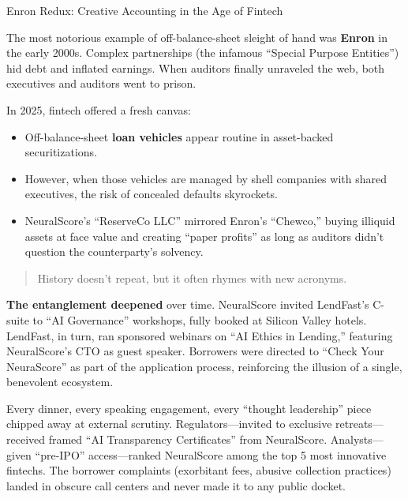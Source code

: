 \begin{HistoricalSidebar}{Enron Redux: Creative Accounting in the Age of Fintech}

The most notorious example of off-balance-sheet sleight of hand was \textbf{Enron} in the early 2000s. Complex partnerships (the infamous “Special Purpose Entities”) hid debt and inflated earnings. When auditors finally unraveled the web, both executives and auditors went to prison.

\medskip

In 2025, fintech offered a fresh canvas:
\begin{itemize}
  \item  Off-balance-sheet \textbf{loan vehicles} appear routine in asset-backed securitizations.
  \item  However, when those vehicles are managed by shell companies with shared executives, the risk of concealed defaults skyrockets.
  \item  NeuralScore’s “ReserveCo LLC” mirrored Enron’s “Chewco,” buying illiquid assets at face value and creating “paper profits” as long as auditors didn’t question the counterparty’s solvency.
\end{itemize}

\begin{quote}
History doesn’t repeat, but it often rhymes with new acronyms.
\end{quote}

\end{HistoricalSidebar}

\medskip

\textbf{The entanglement deepened} over time. NeuralScore invited LendFast’s C-suite to “AI Governance” workshops, fully booked at Silicon Valley hotels. LendFast, in turn, ran sponsored webinars on “AI Ethics in Lending,” featuring NeuralScore’s CTO as guest speaker. Borrowers were directed to “Check Your NeuraScore” as part of the application process, reinforcing the illusion of a single, benevolent ecosystem.

\medskip

Every dinner, every speaking engagement, every “thought leadership” piece chipped away at external scrutiny. Regulators—invited to exclusive retreats—received framed “AI Transparency Certificates” from NeuralScore. Analysts—given “pre-IPO” access—ranked NeuralScore among the top 5 most innovative fintechs. The borrower complaints (exorbitant fees, abusive collection practices) landed in obscure call centers and never made it to any public docket.

